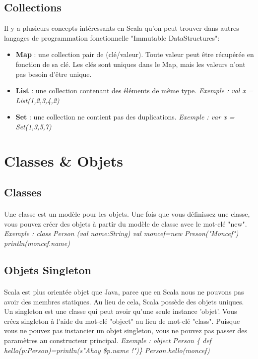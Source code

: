 \subsection{Collections}
Il y a plusieurs concepts intéressants en Scala qu'on peut trouver dans autres langages de programmation fonctionnelle "Immutable DataStructures":
\begin{itemize}
\item \textbf{Map} : une collection pair de (clé/valeur). Toute valeur peut être récupérée en fonction de sa clé. Les clés sont uniques dans le Map, mais les valeurs n'ont pas besoin d'être unique.
\item \textbf{List} : une collection contenant des éléments de même type.   \textit{Exemple : val x = List(1,2,3,4,2)}
\item \textbf{Set } : une collection ne contient pas des duplications. \textit{Exemple : var x = Set(1,3,5,7)}
\end{itemize}
\section{Classes \& Objets}
\subsection{Classes}
\paragraph{}
Une classe est un modèle pour les objets. Une fois que vous définissez une classe, vous pouvez créer des objets à partir du modèle de classe avec le mot-clé "new".\newline
\textit{Exemple : class Person (val name:String)\newline 
val moncef=new Preson("Moncef")\newline
println(moncef.name)}
\subsection{Objets Singleton}
\paragraph{}
Scala est plus orientée objet que Java, parce que en Scala nous ne pouvons pas avoir des membres statiques. Au lieu de cela, Scala possède des objets uniques. Un singleton est une classe qui peut avoir qu'une seule instance 'objet'. Vous créez singleton à l'aide du mot-clé "object" au lieu de mot-clé "class". Puisque vous ne pouvez pas instancier un objet singleton, vous ne pouvez pas passer des paramètres au constructeur principal.
\textit{Exemple : object Person \{ def hello(p:Person)=println(s"Ahoy \$p.name !")\}\newline
Person.hello(moncef)}
